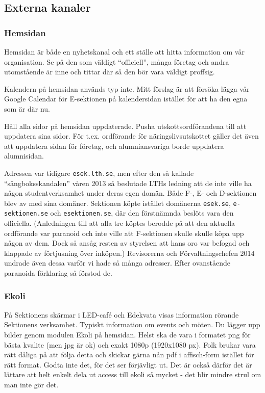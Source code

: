 \documentclass[10pt]{article}
\begin{document}
\subsection{Externa kanaler}
\subsubsection{Hemsidan}
Hemsidan är både en nyhetskanal och ett ställe att hitta information om vår organisation. Se på den som väldigt ``officiell'', många företag och andra utomstående är inne och tittar där så den bör vara väldigt proffsig.

Kalendern på hemsidan används typ inte. Mitt förslag är att försöka lägga vår Google Calendar för E-sektionen på kalendersidan istället för att ha den egna som är där nu.

Håll alla sidor på hemsidan uppdaterade. Pusha utskottsordförandena till att uppdatera sina sidor. För t.ex. ordförande för näringslivsutskottet gäller det även att uppdatera sidan för företag, och alumniansvariga borde uppdatera alumnisidan.

Adressen var tidigare \texttt{esek.lth.se}, men efter den så kallade ``sångboksskandalen'' våren 2013 så beslutade LTHs ledning att de inte ville ha någon studentverksamhet under deras egen domän. Både F-, E- och D-sektionen blev av med sina domäner. Sektionen köpte istället domänerna \texttt{esek.se}, \texttt{e-sektionen.se} och \texttt{esektionen.se}, där den förstnämnda beslöts vara den officiella. (Anledningen till att alla tre köptes berodde på att den aktuella ordförande var paranoid och inte ville att F-sektionen skulle skulle köpa upp någon av dem. Dock så ansåg resten av styrelsen att hans oro var befogad och klappade av förtjusning över inköpen.) Revisorerna och Förvaltningschefen 2014 undrade även dessa varför vi hade så många adresser. Efter ovanstående paranoida förklaring så förstod de.

\subsubsection{Ekoli}
På Sektionens skärmar i LED-café och Edekvata visas information rörande Sektionens verksamhet. Typiskt information om events och möten. Du lägger upp bilder genom modulen Ekoli på hemsidan. Helst ska de vara i formatet png för bästa kvalite (men jpg är ok) och exakt 1080p (1920x1080 px). Folk brukar vara rätt dåliga på att följa detta och skickar gärna nån pdf i affisch-form istället för rätt format. Godta inte det, för det ser förjävligt ut. Det är också därför det är lättare att helt enkelt dela ut access till ekoli så mycket - det blir mindre strul om man inte gör det.
\end{document}
